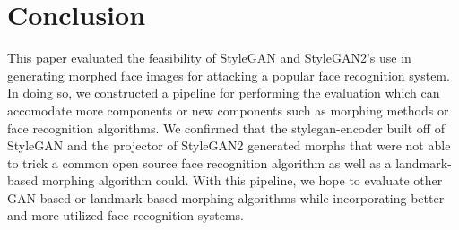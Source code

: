 \documentclass[12pt,twocolumn]{paper}
\begin{document}
\section{Conclusion}
\par
This paper evaluated the feasibility of StyleGAN and StyleGAN2's use in generating morphed face images for attacking a popular face recognition system. In doing so, we constructed a pipeline for performing the evaluation which can accomodate more components or new components such as morphing methods or face recognition algorithms. We confirmed that the stylegan-encoder built off of StyleGAN and the projector of StyleGAN2 generated morphs that were not able to trick a common open source face recognition algorithm as well as a landmark-based morphing algorithm could. With this pipeline, we hope to evaluate other GAN-based or landmark-based morphing algorithms while incorporating better and more utilized face recognition systems.


\end{document}

